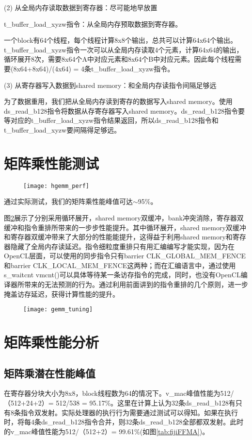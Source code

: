 (2) 从全局内存读取数据到寄存器：尽可能地早放置

t\_buffer\_load\_xyzw指令：从全局内存预取数据到寄存器。

一个block有64个线程，每个线程计算8x8个输出，总共可以计算64x64个输出。t\_buffer\_load\_xyzw指令一次可以从全局内存读取4个元素，计算64x64的输出，循环展开8次，需要8x64个A中对应元素和8x64个B中对应元素。因此每个线程需要(8x64+8x64)/(4x64) = 4条t\_buffer\_load\_xyzw指令。

(3) 从寄存器写入数据到shared memory：和全局内存读指令间隔足够远

为了数据重用，我们把从全局内存读到寄存的数据写入shared memory。使用ds\_read\_b128指令将数据从存寄存器写入shared memory。ds\_read\_b128指令要等对应的t\_buffer\_load\_xyzw指令结果返回，所以ds\_read\_b128指令和t\_buffer\_load\_xyzw要间隔得足够远。

\section{矩阵乘性能测试}
\begin{figure}[htbp]
	\centering
	\texttt{[image: hgemm\_perf]}
	\label{fig:hgemm_perf}
\end{figure}

通过实际测试，我们的矩阵乘性能峰值可达$\sim$95\%。

图\ref{fig:gemm_tuning}展示了分别采用循环展开，shared memory双缓冲，bank冲突消除，寄存器双缓冲和指令重排所带来的一步步性能提升。其中循环展开，shared memory双缓冲和寄存器双缓冲带来了大部分的性能能提升，这得益于利用shared memory和寄存器隐藏了全局内存读延迟。指令细粒度重排只有用汇编编写才能实现，因为在OpenCL层面，可以使用的同步指令只有barrier CLK\_GLOBAL\_MEM\_FENCE和barrier CLK\_LOCAL\_MEM\_FENCE这两种；而在汇编语言中，通过使用s\_waitcnt vmcnt()可以具体等待某一条访存指令的完成，同时，也没有OpenCL编译器所带来的无法预测的行为。通过利用前面讲到的指令重排的几个原则，进一步掩盖访存延迟，获得计算性能的提升。
\begin{figure}[htbp]
	\centering
	\texttt{[image: gemm\_tuning]}
	\label{fig:gemm_tuning}
\end{figure}

\section{矩阵乘性能分析}
\subsection{矩阵乘潜在性能峰值}
在寄存器分块大小为8x8，block线程数为64的情况下。v\_mac峰值性能为512/（512+24+2）= 512/538 = 95.17\%。这里在计算上认为32条ds\_read\_b128有只有8条指令双发射。实际处理器的执行行为需要通过测试可以得知。如果在执行时，将每4条ds\_read\_b128指令合并，则32条ds\_read\_b128全部都双发射。此时的v\_mac峰值性能为512/（512+2）= 99.61\%(如图\ref{tab:fijiFFMA})。

